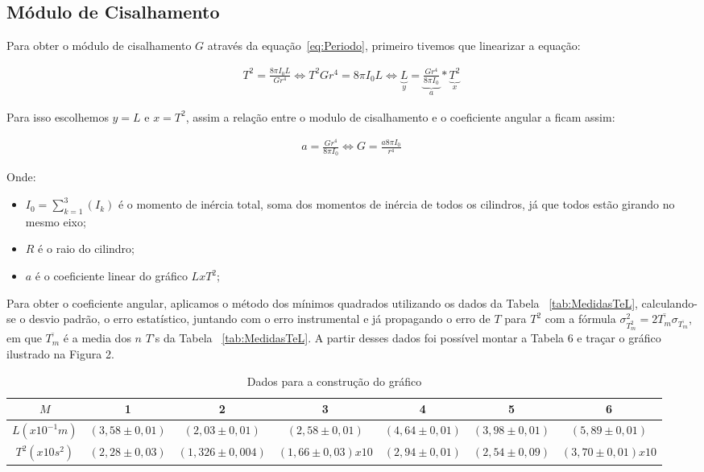 \documentclass[a4paper]{article}
\begin{document}
\subsection{Módulo de Cisalhamento}

Para obter o módulo de cisalhamento $G$ através da equação~\ref{eq:Periodo}, primeiro tivemos que linearizar a equação:

\begin{align}
	T^2 = \frac{8 \pi I_0 L}{G r^4 } \Leftrightarrow T^2 G r^4 = 8 \pi I_0 L \Leftrightarrow \underset{y}{\underbrace{L}} =\underset{a}{\underbrace{\frac{G r^4}{8 \pi I_0}}} *\underset{x}{\underbrace{{T^2}}}\
	\label{eq:Cisalhamento}
\end{align}

Para isso escolhemos $y = L$ e $x = T^2$, assim a relação entre o modulo de cisalhamento e o coeficiente angular a ficam assim:

\begin{align}
	a = \frac{G r^4}{8 \pi I_0} \Leftrightarrow G = \frac{a 8 \pi I_0}{r^4}\
	\label{eq:CoeficienteLinear}
\end{align}

Onde:
\begin{itemize}
	\item $I_0 = \sum_{k=1}^{3}(I_k)$ é o momento de inércia total, soma dos momentos de inércia de todos os cilindros, já que todos estão girando no mesmo eixo;
	\item $R$ é o raio do cilindro;
	\item $a$ é o coeficiente linear do gráfico $L x T^2$;
\end{itemize}

Para obter o coeficiente angular, aplicamos o método dos mínimos quadrados utilizando os dados da Tabela ~\ref{tab:MedidasTeL}, calculando-se o desvio padrão, o erro estatístico, juntando com o erro instrumental e já propagando o erro de $T$ para $T^2$ com a fórmula $\sigma_{T^2_m}^2 = 2 \overline{T_m} \sigma_{\overline{T_m}}$, em que $\overline{T_m}$ é a media dos $n$ $T$'s da Tabela ~\ref{tab:MedidasTeL}. A partir desses dados foi possível montar a Tabela 6 e traçar o gráfico ilustrado na Figura 2.

\begin{table}[!htbp]
\centering
	\caption{Dados para a construção do gráfico}
    \begin{tabular}{|c|c|c|c|c|c|c|}
    \hline
    $M$  & 1            & 2            & 3            & 4            & 5            & 6            \\ \hline
    $L (x 10^{-1}m)$  & $(3,58 \pm 0,01)$ & $(2,03 \pm 0,01) $ & $(2,58 \pm 0,01) $ & $(4,64 \pm 0,01) $ & $(3,98 \pm 0,01) $ & $(5,89 \pm 0,01) $ \\ \hline
    $T^2 (x 10s^2)$ & $(2,28 \pm 0,03)$ & $(1,326 \pm 0,004) $ & $(1,66 \pm 0,03)x10$  & $(2,94\pm0,01) $ & $(2,54 \pm 0,09) $   & $(3,70\pm0,01) x10$  \\ \hline
    \end{tabular}
    \label{tab:grafico}
\end{table}
\end{document}
